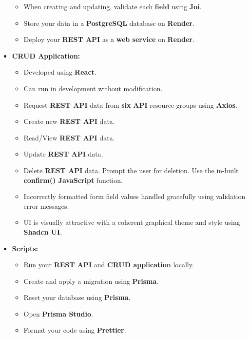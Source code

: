 \documentclass{article}
\begin{document}
\begin{itemize}
\begin{itemize}
		\item When creating and updating, validate each \textbf{field} using \textbf{Joi}. 
		\item Store your data in a \textbf{PostgreSQL} database on \textbf{Render}.
		\item Deploy your \textbf{REST API} as a \textbf{web service} on \textbf{Render}.
	\end{itemize}
	\item \textbf{CRUD Application:}
		\begin{itemize}
		\item Developed using \textbf{React}.
		\item Can run in development without modification.
		\item Request \textbf{REST API} data from \textbf{six} \textbf{API} resource groups using \textbf{Axios}.
		\item Create new \textbf{REST API} data. 
		\item Read/View \textbf{REST API} data.
		\item Update \textbf{REST API} data. 
		\item Delete \textbf{REST API} data. Prompt the user for deletion. Use the in-built \textbf{confirm() JavaScript} function. 
		\item Incorrectly formatted form field values handled gracefully using validation error messages.
		\item UI is visually attractive with a coherent graphical theme and style using \textbf{Shadcn UI}.	
	\end{itemize}

	\item \textbf{Scripts:}
	\begin{itemize}
		\item Run your \textbf{REST API} and \textbf{CRUD application} locally.
		\item Create and apply a migration using \textbf{Prisma}.
		\item Reset your database using \textbf{Prisma}.
		\item Open \textbf{Prisma Studio}. 
		\item Format your code using \textbf{Prettier}.
	\end{itemize}
\end{itemize}
\end{document}
